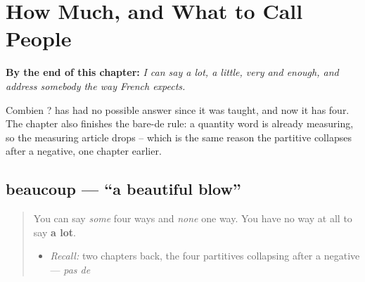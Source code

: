
\chapter{How Much, and What to Call People}
\label{ch:fr-quantity}

\begin{chapteropening}
\textbf{By the end of this chapter:} \emph{I can say a lot, a little, very and enough, and address somebody the way French expects.}

Combien ? has had no possible answer since it was taught, and now it has four. The chapter also finishes the bare-de rule: a quantity word is already measuring, so the measuring article drops -- which is the same reason the partitive collapses after a negative, one chapter earlier.
\end{chapteropening}

\section[beaucoup]{beaucoup — \textquotedblleft{}a beautiful blow\textquotedblright{}}

\label{lesson:FR-C40-beaucoup}



\begin{quote}
You can say \emph{some} four ways and \emph{none} one way. You have no way at all to say \textbf{a lot}.

\begin{itemize}
\raggedright
  \item \emph{Recall:} two chapters back, the four partitives collapsing after a negative — \emph{pas de}
\end{itemize}
\end{quote}

